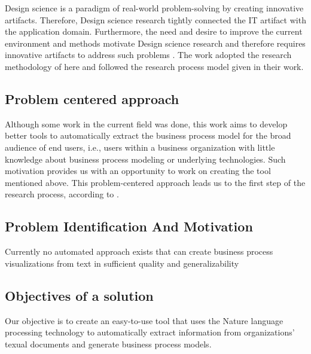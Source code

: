 %


Design science is a paradigm of real-world problem-solving by creating innovative artifacts. Therefore, Design science research tightly connected the IT artifact with the application domain. Furthermore, the need and desire to improve the current environment and methods motivate Design science research and therefore requires innovative artifacts to address such problems \cite{DSM_1}. The work adopted the research methodology of \cite{DSM_2} here and followed the research process model given in their work.

\subsection{Problem centered approach}
Although some work in the current field was done, this work aims to develop better tools to automatically extract the business process model for the broad audience of end users, i.e., users within a business organization with little knowledge about business process modeling or underlying technologies. Such motivation provides us with an opportunity to work on creating the tool mentioned above. This problem-centered approach leads us to the first step of the research process, according to \cite{DSM_2}.

\subsection{Problem Identification And Motivation}
Currently no automated approach exists that can create business process
visualizations from text in sufficient quality and generalizability


\subsection{Objectives of a solution}
Our objective is to create an easy-to-use tool that uses the Nature language processing technology to automatically extract information from organizations' texual documents and generate business process models.

